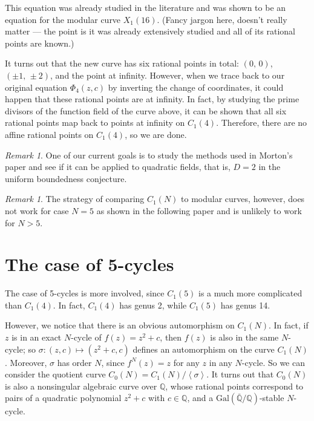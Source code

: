 \documentclass{amsart}
\theoremstyle{plain}
\theoremstyle{definition}
\theoremstyle{remark}
\newtheorem{remark}[theorem]{Remark}
\newcommand{\Q}{\mathbb{Q}}
\newcommand{\gal}{\mathrm{Gal}}
\newcommand{\tup}[1]{\left<#1\right>}
\begin{document}
This equation was already studied in the literature and was shown to
be an equation for the modular curve $X_1(16)$. (Fancy jargon here,
doesn't really matter --- the point is it was already extensively
studied and all of its rational points are known.)

It turns out that the new curve has six rational points in total:
$(0,\, 0)$, $(\pm 1,\, \pm 2)$, and the point at infinity. However,
when we trace back to our original equation $\Phi_4(z, c)$ by
inverting the change of coordinates, it could happen that these
rational points are at infinity. In fact, by studying the prime
divisors of the function field of the curve above, it can be shown
that all six rational points map back to points at infinity on
$C_1(4)$. Therefore, there are no affine rational points on $C_1(4)$,
so we are done.

\begin{remark}
  One of our current goals is to study the methods used in Morton's
  paper and see if it can be applied to quadratic fields, that is, $D
  = 2$ in the uniform boundedness conjecture.
\end{remark}

\begin{remark}
  The strategy of comparing $C_1(N)$ to modular curves, however, does
  not work for case $N = 5$ as shown in the following paper and is
  unlikely to work for $N > 5$.
\end{remark}



\section{The case of 5-cycles}

The case of 5-cycles is more involved, since $C_1(5)$ is a much more
complicated than $C_1(4)$. In fact, $C_1(4)$ has genus 2, while
$C_1(5)$ has genus 14.

However, we notice that there is an obvious automorphism on
$C_1(N)$. In fact, if $z$ is in an exact $N$-cycle of $f(z) = z^2 +
c$, then $f(z)$ is also in the same $N$-cycle; so $\sigma: (z, c)
\mapsto (z^2 + c, c)$ defines an automorphism on the curve
$C_1(N)$. Moreover, $\sigma$ has order $N$, since $f^N(z) = z$ for any
$z$ in any $N$-cycle. So we can consider the quotient curve $C_0(N) =
C_1(N)/\tup{\sigma}$. It turns out that $C_0(N)$ is also a nonsingular
algebraic curve over $\Q$, whose rational points correspond to pairs
of a quadratic polynomial $z^2 + c$ with $c \in \Q$, and a
$\gal(\bar{\Q}/\Q)$-stable $N$-cycle.
\end{document}
